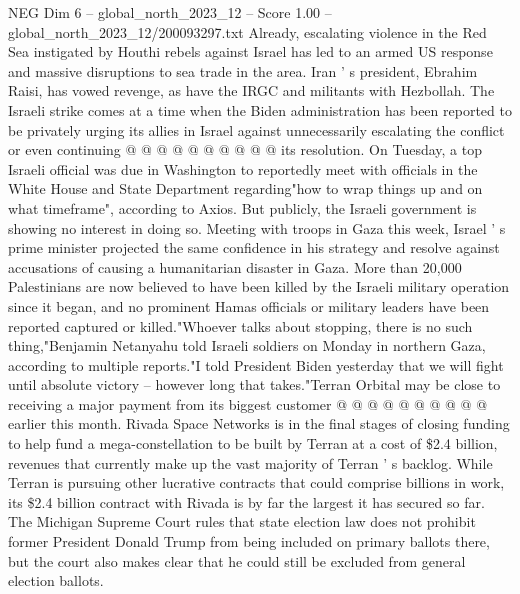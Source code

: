 \begin{textsample}{NEG Dim 6 – global\_north\_2023\_12 – Score 1.00 – global\_north\_2023\_12/200093297.txt}
Already, escalating violence in the Red Sea instigated by Houthi rebels against Israel has led to an armed US response and massive disruptions to sea trade in the area.
Iran ' s president, Ebrahim Raisi, has vowed revenge, as have the IRGC and militants with Hezbollah.
The Israeli strike comes at a time when the Biden administration has been reported to be privately urging its allies in Israel against unnecessarily escalating the conflict or even continuing @ @ @ @ @ @ @ @ @ @ its resolution.
On Tuesday, a top Israeli official was due in Washington to reportedly meet with officials in the White House and State Department regarding"how to wrap things up and on what timeframe", according to Axios.
But publicly, the Israeli government is showing no interest in doing so.
Meeting with troops in Gaza this week, Israel ' s prime minister projected the same confidence in his strategy and resolve against accusations of causing a humanitarian disaster in Gaza.
More than 20,000 Palestinians are now believed to have been killed by the Israeli military operation since it began, and no prominent Hamas officials or military leaders have been reported captured or killed."Whoever talks about stopping, there is no such thing,"Benjamin Netanyahu told Israeli soldiers on Monday in northern Gaza, according to multiple reports."I told President Biden yesterday that we will fight until absolute victory -- however long that takes."Terran Orbital may be close to receiving a major payment from its biggest customer @ @ @ @ @ @ @ @ @ @ earlier this month.
Rivada Space Networks is in the final stages of closing funding to help fund a mega-constellation to be built by Terran at a cost of \$2.4 billion, revenues that currently make up the vast majority of Terran ' s backlog.
While Terran is pursuing other lucrative contracts that could comprise billions in work, its \$2.4 billion contract with Rivada is by far the largest it has secured so far.
The Michigan Supreme Court rules that state election law does not prohibit former President Donald Trump from being included on primary ballots there, but the court also makes clear that he could still be excluded from general election ballots.

\end{textsample}
